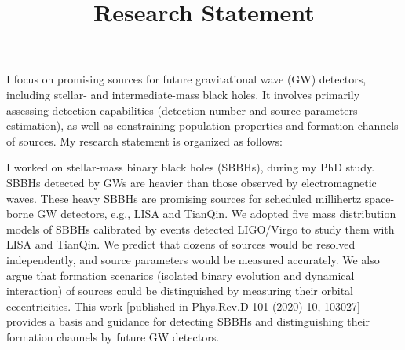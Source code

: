 \documentclass[12pt,a4paper,sans]{article}%
\title{\vspace{-2.5cm}\Huge Research Statement \vspace{-2.2em}}
\date{}
\begin{document}
\maketitle

I focus on promising sources for future gravitational wave (GW) detectors, including stellar- and
intermediate-mass black holes. It involves primarily assessing detection capabilities (detection number and source
parameters estimation), as well as constraining population properties and formation channels of sources. My research statement is organized as
follows:  

I worked on stellar-mass binary black holes (SBBHs), during my PhD study. SBBHs detected by GWs are heavier than those observed by electromagnetic waves. These heavy SBBHs are promising sources for scheduled
millihertz space-borne GW detectors, e.g., LISA and TianQin. We adopted five mass
distribution models of SBBHs calibrated by events detected LIGO/Virgo to study them with LISA and TianQin. We predict
that dozens of sources would be resolved independently, and source parameters
would be measured accurately. We also argue that formation scenarios (isolated binary evolution and dynamical interaction) of sources
could be distinguished by measuring their orbital eccentricities. This work [published in Phys.Rev.D 101 (2020) 10, 103027] provides a basis and guidance for detecting SBBHs and distinguishing their formation channels by future GW detectors. 
\end{document}
